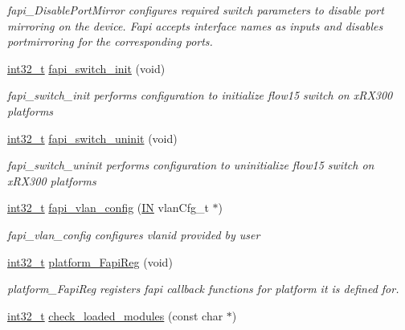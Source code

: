\begin{DoxyCompactItemize}
\begin{DoxyCompactList}\small\item\em fapi\-\_\-\-Disable\-Port\-Mirror configures required switch parameters to disable port mirroring on the device. Fapi accepts interface names as inputs and disables portmirroring for the corresponding ports. \end{DoxyCompactList}\item 
\hyperlink{commondefs_8h_a32f2e37ee053cf2ce8ca28d1f74630e5}{int32\-\_\-t} \hyperlink{group__FAPI__SYSTEM_ga82fb4eb59a36e1c2f3f34ac47ea60fe3}{fapi\-\_\-switch\-\_\-init} (void)
\begin{DoxyCompactList}\small\item\em fapi\-\_\-switch\-\_\-init performs configuration to initialize flow15 switch on x\-R\-X300 platforms \end{DoxyCompactList}\item 
\hyperlink{commondefs_8h_a32f2e37ee053cf2ce8ca28d1f74630e5}{int32\-\_\-t} \hyperlink{group__FAPI__SYSTEM_ga2886d2dde68d5575928453eb0957645c}{fapi\-\_\-switch\-\_\-uninit} (void)
\begin{DoxyCompactList}\small\item\em fapi\-\_\-switch\-\_\-uninit performs configuration to uninitialize flow15 switch on x\-R\-X300 platforms \end{DoxyCompactList}\item 
\hyperlink{commondefs_8h_a32f2e37ee053cf2ce8ca28d1f74630e5}{int32\-\_\-t} \hyperlink{group__FAPI__SYSTEM_ga671ea3858bbf8688cd3be86c74c86489}{fapi\-\_\-vlan\-\_\-config} (\hyperlink{group__LIBHELP_gac2bbd6d630a06a980d9a92ddb9a49928}{I\-N} vlan\-Cfg\-\_\-t $\ast$)
\begin{DoxyCompactList}\small\item\em fapi\-\_\-vlan\-\_\-config configures vlanid provided by user \end{DoxyCompactList}\item 
\hyperlink{commondefs_8h_a32f2e37ee053cf2ce8ca28d1f74630e5}{int32\-\_\-t} \hyperlink{group__FAPI__SYSTEM_ga203a12a7d658d901f1fed2486eac2e2b}{platform\-\_\-\-Fapi\-Reg} (void)
\begin{DoxyCompactList}\small\item\em platform\-\_\-\-Fapi\-Reg registers fapi callback functions for platform it is defined for. \end{DoxyCompactList}\item 
\hyperlink{commondefs_8h_a32f2e37ee053cf2ce8ca28d1f74630e5}{int32\-\_\-t} \hyperlink{group__FAPI__SYSTEM_ga7408443ffef2e830499e107be0272dda}{check\-\_\-loaded\-\_\-modules} (const char $\ast$)

\end{DoxyCompactItemize}

